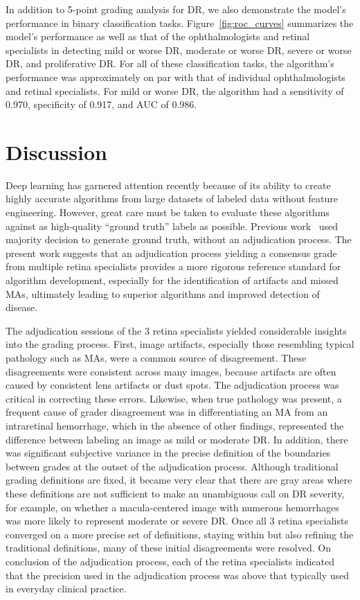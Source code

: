 \documentclass{llncs}
\begin{document}
In addition to 5-point grading analysis for DR, we also demonstrate the model's performance in binary classification tasks.  Figure~\ref{fig:roc_curves} summarizes the model's performance as well as that of the ophthalmologists and retinal specialists in detecting mild or worse DR, moderate or worse DR, severe or worse DR, and proliferative DR. For all of these classification tasks, the algorithm's performance was approximately on par with that of individual ophthalmologists and retinal specialists. For mild or worse DR, the algorithm had a sensitivity of 0.970, specificity of 0.917, and AUC of 0.986.


\section{Discussion}
Deep learning has garnered attention recently because of its ability to create highly accurate algorithms from large datasets of labeled data without feature engineering. However, great care must be taken to evaluate these algorithms against as high-quality ``ground truth'' labels as possible.  Previous work~\cite{gulshan2016development} used majority decision to generate ground truth, without an adjudication process. The present work suggests that an adjudication process yielding a consensus grade from multiple retina specialists provides a more rigorous reference standard for algorithm development, especially for the identification of artifacts and missed MAs, ultimately leading to superior algorithms and improved detection of disease.

The adjudication sessions of the 3 retina specialists yielded considerable insights into the grading process.  First, image artifacts, especially those resembling typical pathology such as MAs, were a common source of disagreement. These disagreements were consistent across many images, because artifacts are often caused by consistent lens artifacts or dust spots. The adjudication process was critical in correcting these errors. Likewise, when true pathology was present, a frequent cause of grader disagreement was in differentiating an MA from an intraretinal hemorrhage, which in the absence of other findings, represented the difference between labeling an image as mild or moderate DR. In addition, there was significant subjective variance in the precise definition of the boundaries between grades at the outset of the adjudication process. Although traditional grading definitions are fixed, it became very clear that there are gray areas where these definitions are not sufficient to make an unambiguous call on DR severity, for example, on whether a macula-centered image with numerous hemorrhages was more likely to represent moderate or severe DR. Once all 3 retina specialists converged on a more precise set of definitions, staying within but also refining the traditional definitions, many of these initial disagreements were resolved. On conclusion of the adjudication process, each of the retina specialists indicated that the precision used in the adjudication process was above that typically used in everyday clinical practice.
\end{document}
